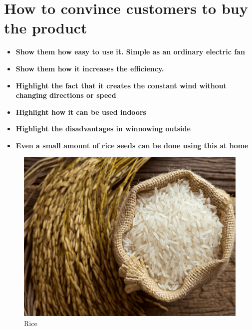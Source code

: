 \documentclass[12pt]{article}
\begin{document}
\section{How to convince customers to buy the product}
\begin{itemize}
    \item \textbf{Show them how easy to use it. Simple as an ordinary electric fan}
    \item \textbf{Show them how it increases the efficiency.}
    \item \textbf{Highlight the fact that it creates the constant wind without changing directions or speed}
    \item \textbf{Highlight how it can be used indoors}
    \item \textbf{Highlight the disadvantages in winnowing outside}
    \item \textbf{Even a small amount of rice seeds can be done using this at home}
    
\end{itemize}

\vspace{2 cm}
\begin{figure}[h!]
  \centering
  \includegraphics[width=\linewidth]{rice.png}
  \caption{Rice}
  \label{fig:Rice}
\end{figure}
\end{document}
